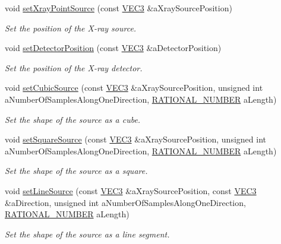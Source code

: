 \begin{DoxyCompactItemize}
void \hyperlink{classg_virtual_x_ray_1_1_x_ray_detector_a643cbb35e442638652c828710d722900}{setXrayPointSource} (const \hyperlink{class_math_1_1_vec3}{VEC3} \&aXraySourcePosition)
\begin{DoxyCompactList}\small\item\em Set the position of the X-\/ray source. \end{DoxyCompactList}\item 
void \hyperlink{classg_virtual_x_ray_1_1_x_ray_detector_a4eed3c71235a854b66fd5212316d3a73}{setDetectorPosition} (const \hyperlink{class_math_1_1_vec3}{VEC3} \&aDetectorPosition)
\begin{DoxyCompactList}\small\item\em Set the position of the X-\/ray detector. \end{DoxyCompactList}\item 
void \hyperlink{classg_virtual_x_ray_1_1_x_ray_detector_a346c280ce7648e4fcc7f42bbb06e6ab7}{setCubicSource} (const \hyperlink{class_math_1_1_vec3}{VEC3} \&aXraySourcePosition, unsigned int aNumberOfSamplesAlongOneDirection, \hyperlink{namespace_utilities_a40969b96bd8d847b962e297cb79f08ce}{RATIONAL\_\-NUMBER} aLength)
\begin{DoxyCompactList}\small\item\em Set the shape of the source as a cube. \end{DoxyCompactList}\item 
void \hyperlink{classg_virtual_x_ray_1_1_x_ray_detector_aa6f970bda1aa9ba777f6b4cc99102ea3}{setSquareSource} (const \hyperlink{class_math_1_1_vec3}{VEC3} \&aXraySourcePosition, unsigned int aNumberOfSamplesAlongOneDirection, \hyperlink{namespace_utilities_a40969b96bd8d847b962e297cb79f08ce}{RATIONAL\_\-NUMBER} aLength)
\begin{DoxyCompactList}\small\item\em Set the shape of the source as a square. \end{DoxyCompactList}\item 
void \hyperlink{classg_virtual_x_ray_1_1_x_ray_detector_a5bbcd6912a95907c1f4268f065146690}{setLineSource} (const \hyperlink{class_math_1_1_vec3}{VEC3} \&aXraySourcePosition, const \hyperlink{class_math_1_1_vec3}{VEC3} \&aDirection, unsigned int aNumberOfSamplesAlongOneDirection, \hyperlink{namespace_utilities_a40969b96bd8d847b962e297cb79f08ce}{RATIONAL\_\-NUMBER} aLength)
\begin{DoxyCompactList}\small\item\em Set the shape of the source as a line segment. \end{DoxyCompactList}\item 

\end{DoxyCompactItemize}
